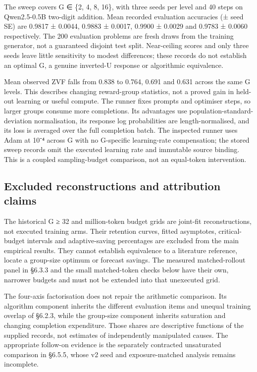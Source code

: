 \documentclass[12pt,a4paper]{report}
\begin{document}
The sweep covers G ∈ \{2, 4, 8, 16\}, with three seeds per level and 40
steps on Qwen2.5-0.5B two-digit addition. Mean recorded evaluation
accuracies (± seed SE) are 0.9817 ± 0.0044, 0.9883 ± 0.0017, 0.9900 ±
0.0029 and 0.9783 ± 0.0060 respectively. The 200 evaluation problems are
fresh draws from the training generator, not a guaranteed disjoint test
split. Near-ceiling scores and only three seeds leave little sensitivity
to modest differences; these records do not establish an optimal G, a
genuine inverted-U response or algorithmic equivalence.

Mean observed ZVF falls from 0.838 to 0.764, 0.691 and 0.631 across the
same G levels. This describes changing reward-group statistics, not a
proved gain in held-out learning or useful compute. The runner fixes
prompts and optimiser steps, so larger groups consume more completions.
Its advantages use population-standard-deviation normalisation, its
response log probabilities are length-normalised, and its loss is
averaged over the full completion batch. The inspected runner uses Adam
at 10⁻⁴ across G with no G-specific learning-rate compensation; the
stored sweep records omit the executed learning rate and immutable
source binding. This is a coupled sampling-budget comparison, not an
equal-token intervention.

\subsection{Excluded reconstructions and attribution
claims}\label{excluded-reconstructions-and-attribution-claims}

The historical G ≥ 32 and million-token budget grids are joint-fit
reconstructions, not executed training arms. Their retention curves,
fitted asymptotes, critical-budget intervals and adaptive-saving
percentages are excluded from the main empirical results. They cannot
establish equivalence to a literature reference, locate a group-size
optimum or forecast savings. The measured matched-rollout panel in
§6.3.3 and the small matched-token checks below have their own, narrower
budgets and must not be extended into that unexecuted grid.

The four-axis factorisation does not repair the arithmetic comparison.
Its algorithm component inherits the different evaluation items and
unequal training overlap of §6.2.3, while the group-size component
inherits saturation and changing completion expenditure. Those shares
are descriptive functions of the supplied records, not estimates of
independently manipulated causes. The appropriate follow-on evidence is
the separately contracted unsaturated comparison in §6.5.5, whose v2
seed and exposure-matched analysis remains incomplete.
\end{document}
